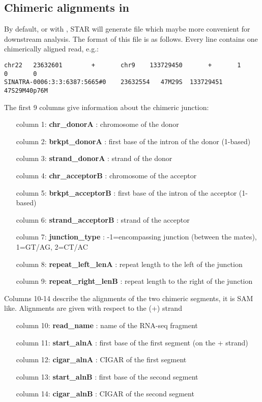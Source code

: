 \documentclass[12pt]{article}
\begin{document}
\subsection{Chimeric alignments in }
By default, or with  , STAR will generate  file which maybe more convenient for downstream analysis.
The format of this file is as follows. Every line contains one chimerically aligned read, e.g.:
\begin{verbatim}
chr22   23632601        +       chr9    133729450       +       1       0       0      
SINATRA-0006:3:3:6387:5665#0    23632554   47M29S  133729451       47S29M40p76M
\end{verbatim}

The first 9 columns give information about the chimeric junction:
\begin{itemize}[leftmargin=1in]
\item[column 1:] \textbf{chr\_donorA} : chromosome of the donor
\item[column 2:] \textbf{brkpt\_donorA} : first base of the intron of the donor (1-based)
\item[column 3:] \textbf{strand\_donorA} : strand of the donor
\item[column 4:] \textbf{chr\_acceptorB} : chromosome of the acceptor
\item[column 5:] \textbf{brkpt\_acceptorB} : first base of the intron of the acceptor (1-based)
\item[column 6:] \textbf{strand\_acceptorB} : strand of the acceptor
\item[column 7:] \textbf{junction\_type} : -1=encompassing junction (between the mates), 1=GT/AG, 2=CT/AC
\item[column 8:] \textbf{repeat\_left\_lenA} : repeat length to the left of the junction
\item[column 9:] \textbf{repeat\_right\_lenB} : repeat length to the right of the junction
\end{itemize}

Columns 10-14 describe the alignments of the two chimeric segments, it is SAM like. Alignments are given with respect to the (+) strand
\begin{itemize}[leftmargin=1in]
\item[column 10:] \textbf{read\_name} : name of the RNA-seq fragment
\item[column 11:] \textbf{start\_alnA} : first base of the first segment (on the + strand)
\item[column 12:] \textbf{cigar\_alnA} : CIGAR of the first segment
\item[column 13:] \textbf{start\_alnB} : first base of the second segment
\item[column 14:] \textbf{cigar\_alnB} : CIGAR of the second segment
\end{itemize}
\end{document}
